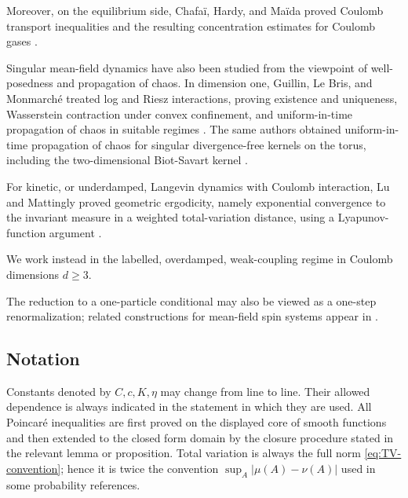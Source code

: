 \documentclass[12pt,reqno,letterpaper]{amsart}
\theoremstyle{definition}
\theoremstyle{remark}
\numberwithin{equation}{section}
\begin{document}
Moreover, on the equilibrium side, Chafa\"i, Hardy, and Ma\"ida proved Coulomb transport inequalities and the resulting concentration estimates for Coulomb gases \cite{CHM}.

Singular mean-field dynamics have also been studied from the viewpoint of
well-posedness and propagation of chaos. In dimension one, Guillin, Le Bris, and Monmarch\'e treated log and Riesz interactions, proving existence and uniqueness, Wasserstein contraction under convex confinement, and uniform-in-time propagation of chaos in suitable regimes
\cite{GuillinLeBrisMonmarcheRiesz}. The same authors obtained
uniform-in-time propagation of chaos for singular divergence-free kernels
on the torus, including the two-dimensional Biot-Savart kernel
\cite{GuillinLeBrisMonmarcheVortex}.

For kinetic, or underdamped, Langevin dynamics with Coulomb interaction, Lu and Mattingly proved geometric ergodicity, namely exponential
convergence to the invariant measure in a weighted total-variation
distance, using a Lyapunov-function argument \cite{LuMattingly}.


We work instead in the labelled, overdamped, weak-coupling regime in
Coulomb dimensions \(d\ge3\). 

The reduction to a one-particle conditional may also be
viewed as a one-step renormalization; related constructions for mean-field
spin systems appear in
\cite{BauerschmidtBodineau2019,BeckerMenegaki2020}.


\subsection{Notation}
Constants denoted by \(C,c,K,\eta\) may change from line to line.  Their
allowed dependence is always indicated in the statement in which they are
used.  All Poincar\'e inequalities are first proved on the displayed core of
smooth functions and then extended to the closed form domain by the closure
procedure stated in the relevant lemma or proposition.  Total variation is
always the full norm \eqref{eq:TV-convention}; hence it is twice the convention
\(\sup_A|\mu(A)-\nu(A)|\) used in some probability references.
\end{document}
